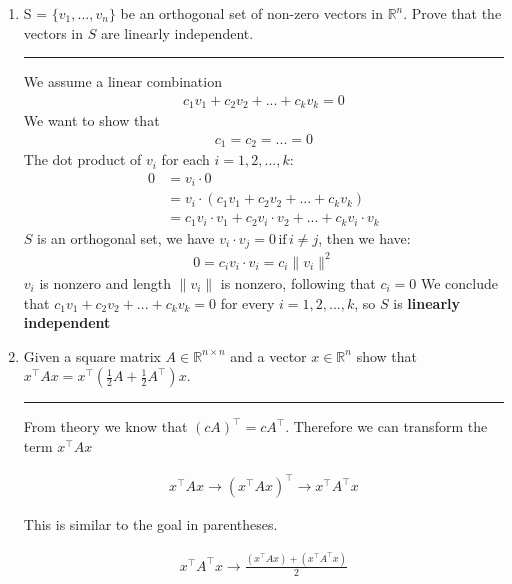 \documentclass[12pt]{article}
\begin{document}
\begin{enumerate}
    \item S = $\{v_1, ... , v_n\}$ be an orthogonal set of non-zero vectors in $\mathbb{R}^n$. Prove that the vectors in $S$ are linearly independent.

    \noindent\rule{\linewidth}{1pt}

    We assume a linear combination
    \begin{align*} 
        c_1 v_1 + c_2 v_2 + ... + c_k v_k = 0
    \end{align*}
    We want to show that
    \begin{align*} 
        c_1 = c_2 = ... = 0
    \end{align*}
    The dot product of $v_i$ for each $ i = 1,2, ... , k $:
    \begin{align*} 
        0 &= v_i \cdot 0 \\
          &= v_i \cdot (c_1 v_1 + c_2 v_2 + ... + c_k v_k) \\
          &= c_1 v_i \cdot v_1 + c_2 v_i \cdot v_2 + ... + c_k v_i \cdot v_k
    \end{align*}
    $S$ is an orthogonal set, we have $v_i \cdot v_j = 0 \, \textrm{if} \, i \neq j $, then we have:
    \begin{align*} 
        0 = c_i v_i \cdot v_i = c_i \|v_i\|^2
    \end{align*}
    $v_i$ is nonzero and length $\|v_i\|$ is nonzero, following that $c_i = 0$ \newline
    We conclude that $c_1 v_1 + c_2 v_2 + ... + c_k v_k = 0$ for every $ i = 1,2, ... , k $, so $S$ is \textbf{linearly independent}

    \item Given a square matrix $A \in \mathbb{R}^{n \times n}$ and a vector $x \in \mathbb{R}^n$ show that $x^\intercal Ax = x^\intercal ( \frac{1}{2} A + \frac{1}{2} A^\intercal )x$.
    
    \noindent\rule{\linewidth}{1pt}

    From theory we know that $(cA)^\intercal = cA^\intercal$. Therefore we can transform the term $x^\intercal Ax$

    \begin{align*}
        x^\intercal Ax \rightarrow (x^\intercal Ax)^\intercal \rightarrow x^\intercal A^\intercal x
    \end{align*}

    This is similar to the goal in parentheses.

    \begin{align*}
        x^\intercal A^\intercal x \rightarrow \frac{(x^\intercal Ax) + (x^\intercal A^\intercal x)}{2}
    \end{align*}


\end{enumerate}
\end{document}
